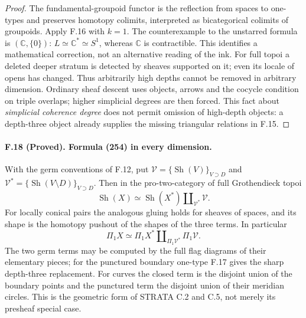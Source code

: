 \begin{proof}
The fundamental-groupoid functor is the reflection from spaces to
one-types and preserves homotopy colimits, interpreted as
bicategorical colimits of groupoids. Apply F.16 with $k=1$. The
counterexample to the unstarred formula is $(\mathbb C,\{0\})$:
$L\simeq\mathbb C^*\simeq S^1$, whereas $\mathbb C$ is contractible.
This identifies a mathematical correction, not an alternative reading
of the ink. For full topoi a deleted deeper stratum is detected by
sheaves supported on it; even its locale of opens has changed. Thus
arbitrarily high depths cannot be removed in arbitrary dimension.
Ordinary sheaf descent uses objects, arrows and the cocycle condition
on triple overlaps; higher simplicial degrees are then forced. This
fact about \emph{simplicial coherence degree} does not permit omission
of high-depth objects: a depth-three object already supplies the
missing triangular relations in F.15.
\end{proof}

\paragraph{F.18 (Proved). Formula (254) in every dimension.}
With the germ conventions of F.12, put
$\mathcal V=\{\operatorname{Sh}(V)\}_{V\supset D}$ and
$\mathcal V^*=\{\operatorname{Sh}(V\setminus D)\}_{V\supset D}$.
Then in the pro-two-category of full Grothendieck topoi
\[
 \operatorname{Sh}(X)\simeq
 \operatorname{Sh}(X^*)\amalg_{\mathcal V^*}\mathcal V .
\]
For locally conical pairs the analogous gluing holds for sheaves of
spaces, and its shape is the homotopy pushout of the shapes of the
three terms. In particular
\[
 \Pi_1X\simeq\Pi_1X^*\amalg_{\Pi_1\mathcal V^*}\Pi_1\mathcal V.
\]
The two germ terms may be computed by the full flag diagrams of their
elementary pieces; for the punctured boundary one-type F.17 gives the
sharp depth-three replacement. For curves the closed term is the
disjoint union of the boundary points and the punctured term the
disjoint union of their meridian circles. This is the geometric form
of STRATA C.2 and C.5, not merely its presheaf special case.

